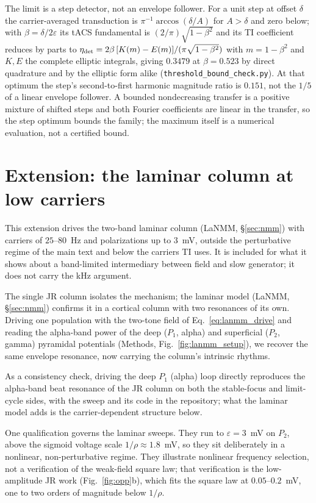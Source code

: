 \documentclass[11pt,a4paper]{article}
\begin{document}
The limit is a step detector, not an envelope follower. For a unit step at offset
$\delta$ the carrier-averaged transduction is $\pi^{-1}\arccos(\delta/A)$ for $A>\delta$
and zero below; with $\beta=\delta/2\varepsilon$ its tACS fundamental is
$(2/\pi)\sqrt{1-\beta^2}$ and its TI coefficient reduces by parts to
$\eta_{\rm det}=2\beta\,[K(m)-E(m)]/(\pi\sqrt{1-\beta^2})$ with $m=1-\beta^2$ and $K,E$
the complete elliptic integrals, giving $0.3479$ at $\beta=0.523$ by direct quadrature and
by the elliptic form alike (\texttt{threshold\_bound\_check.py}). At that optimum the
step's second-to-first harmonic magnitude ratio is $0.151$, not the $1/5$ of a linear
envelope follower. A bounded nondecreasing transfer is a positive mixture of shifted steps
and both Fourier coefficients are linear in the transfer, so the step optimum bounds the
family; the maximum itself is a numerical evaluation, not a certified bound.

\section{Extension: the laminar column at low carriers}\label{app:lanmm}
\label{sec:lanmm-results}
This extension drives the two-band laminar column (LaNMM, \S\ref{sec:nmm}) with carriers
of $25$--$80$~Hz and polarizations up to $3$~mV, outside the perturbative regime of the
main text and below the carriers TI uses. It is included for what it shows about a
band-limited intermediary between field and slow generator; it does not carry the kHz
argument.

The single JR column isolates the mechanism; the laminar model
(LaNMM, \S\ref{sec:nmm}) confirms it in a cortical column with two resonances of its
own. Driving one population with the two-tone field of Eq.~\eqref{eq:lanmm_drive}
and reading the alpha-band power of the deep ($P_1$, alpha) and superficial ($P_2$,
gamma) pyramidal potentials (Methods, Fig.~\ref{fig:lanmm_setup}), we recover the
same envelope resonance, now carrying the column's intrinsic rhythms.

As a consistency check, driving the deep $P_1$ (alpha) loop directly reproduces the
alpha-band beat resonance of the JR column on both the stable-focus and limit-cycle sides,
with the sweep and its code in the repository; what the laminar model adds is the
carrier-dependent structure below.

One qualification governs the laminar sweeps. They run to $\varepsilon=3$~mV on $P_2$,
above the sigmoid voltage scale $1/\rho\approx1.8$~mV, so they sit deliberately in a
nonlinear, non-perturbative regime. They illustrate nonlinear frequency selection, not a
verification of the weak-field square law; that verification is the
low-amplitude JR work (Fig.~\ref{fig:opp}b), which fits the square law at
$0.05$--$0.2$~mV, one to two orders of magnitude below $1/\rho$.
\end{document}
